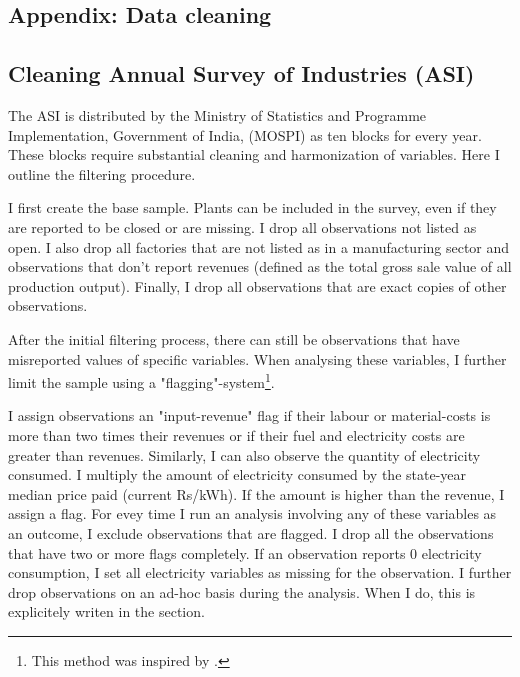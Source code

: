 \documentclass[11pt]{article}
\begin{document}
\begin{appendices}

\newpage

\section{Appendix: Data cleaning}%
\label{sec:appendix_data_cleaning}

\subsection{Cleaning Annual Survey of Industries (ASI)}%
\label{sub:cleaning_annual_survey_of_industries_asi}

The ASI is distributed by the Ministry of Statistics and Programme Implementation, Government of India, (MOSPI) as ten blocks for every year. These blocks require substantial cleaning and harmonization of variables. Here I outline the filtering procedure.

I first create the base sample. Plants can be included in the survey, even if they are reported to be closed or are missing. I drop all observations not listed as open. I also drop all factories that are not listed as in a manufacturing sector and observations that don't report revenues (defined as the total gross sale value of all production output). Finally, I drop all observations that are exact copies of other observations.

After the initial filtering process, there can still be observations that have misreported values of specific variables. When analysing these variables, I further limit the sample using a "flagging"-system\footnote{This method was inspired by \cite{allcott_how_2016}.}. 

I assign observations an "input-revenue" flag if their labour or material-costs is more than two times their revenues or if their fuel and electricity costs are greater than revenues. Similarly, I can also observe the quantity of electricity consumed. I multiply the amount of electricity consumed by the state-year median price paid (current Rs/kWh). If the amount is higher than the revenue, I assign a flag. For evey time I run an analysis involving any of these variables as an outcome, I exclude observations that are flagged. I drop all the observations that have two or more flags completely. If an observation reports 0 electricity consumption, I set all electricity variables as missing for the observation. I further drop observations on an ad-hoc basis during the analysis. When I do, this is explicitely writen in the section.


\end{appendices}
\end{document}
